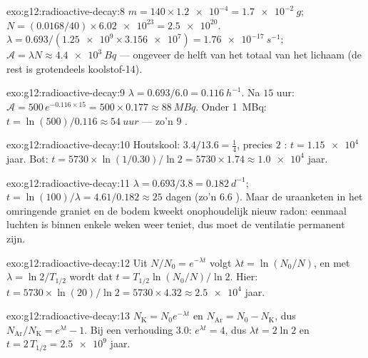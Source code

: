 \begin{solution}{exo:g12:radioactive-decay:8}
$m = 140 \times \num{1.2e-4} = \qty{1.7e-2}{g}$;
$N = (0.0168/40) \times \num{6.02e23} = \num{2.5e20}$.
$\lambda = 0.693/(\num{1.25e9} \times \num{3.156e7}) =
\qty{1.76e-17}{s^{-1}}$; $\mathcal A = \lambda N \approx \qty{4.4e3}{Bq}$ ---
ongeveer de helft van het totaal van het lichaam (de rest is grotendeels
koolstof-14).
\end{solution}

\begin{solution}{exo:g12:radioactive-decay:9}
$\lambda = 0.693/6.0 = \qty{0.116}{h^{-1}}$. Na $15$ uur:
$\mathcal A = 500\,e^{-0.116 \times 15} = 500 \times 0.177 \approx
\qty{88}{MBq}$. Onder \qty{1}{MBq}: $t = \ln(500)/0.116 \approx \qty{54}{uur}$
--- zo'n $9$ .
\end{solution}

\begin{solution}{exo:g12:radioactive-decay:10}
Houtskool: $3.4/13.6 = \tfrac14$, precies $2$ :
$t = \num{1.15e4}$ jaar. Bot:
$t = \num{5730} \times \ln(1/0.30)/\ln 2 = \num{5730} \times 1.74
\approx \num{1.0e4}$ jaar.
\end{solution}

\begin{solution}{exo:g12:radioactive-decay:11}
$\lambda = 0.693/3.8 = \qty{0.182}{d^{-1}}$;
$t = \ln(100)/\lambda = 4.61/0.182 \approx 25$ dagen (zo'n $6.6$
). Maar de uraanketen in het omringende graniet en de bodem
kweekt onophoudelijk nieuw radon: eenmaal luchten is binnen enkele weken weer
teniet, dus moet de ventilatie permanent zijn.
\end{solution}

\begin{solution}{exo:g12:radioactive-decay:12}
Uit $N/N_0 = e^{-\lambda t}$ volgt $\lambda t = \ln(N_0/N)$, en met
$\lambda = \ln 2/T_{1/2}$ wordt dat $t = T_{1/2}\ln(N_0/N)/\ln 2$. Hier:
$t = \num{5730} \times \ln(20)/\ln 2 = \num{5730} \times 4.32 \approx
\num{2.5e4}$ jaar.
\end{solution}

\begin{solution}{exo:g12:radioactive-decay:13}
$N_{\mathrm K} = N_0 e^{-\lambda t}$ en
$N_{\mathrm{Ar}} = N_0 - N_{\mathrm K}$, dus
$N_{\mathrm{Ar}}/N_{\mathrm K} = e^{\lambda t} - 1$. Bij een verhouding $3.0$:
$e^{\lambda t} = 4$, dus $\lambda t = 2\ln 2$ en $t = 2\,T_{1/2} =
\num{2.5e9}$ jaar.
\end{solution}

